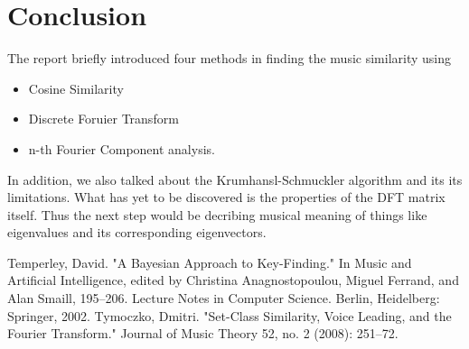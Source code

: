 \documentclass[12pt]{report}
\theoremstyle{definition}
\begin{document}
\section{Conclusion}
The report briefly introduced four methods in finding the music similarity using
\begin{itemize}
    \item Cosine Similarity
    \item Discrete Foruier Transform
    \item n-th Fourier Component analysis.
\end{itemize}
In addition, we also talked about the Krumhansl-Schmuckler algorithm and its
its limitations. What has yet to be discovered is the properties of the DFT matrix
itself. Thus the next step would be decribing musical meaning of things like
eigenvalues and its corresponding eigenvectors.
\begin{thebibliography}{9}

Temperley, David. "A Bayesian Approach to Key-Finding." In Music and Artificial Intelligence, edited by Christina Anagnostopoulou, Miguel Ferrand, and Alan Smaill, 195–206. Lecture Notes in Computer Science. Berlin, Heidelberg: Springer, 2002.
Tymoczko, Dmitri. "Set-Class Similarity, Voice Leading, and the Fourier Transform." Journal of Music Theory 52, no. 2 (2008): 251–72.


\end{thebibliography}
\end{document}
